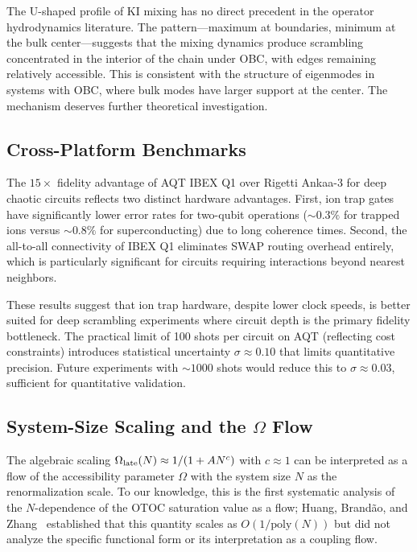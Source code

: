 \documentclass[twocolumn,showpacs,preprintnumbers,amsmath,amssymb,aps,prl]{revtex4-2}
\begin{document}
The U-shaped profile of KI mixing has no direct precedent in the operator
hydrodynamics literature. The pattern---maximum at boundaries, minimum at the
bulk center---suggests that the mixing dynamics produce scrambling concentrated in
the interior of the chain under OBC, with edges remaining relatively accessible.
This is consistent with the structure of eigenmodes in systems with OBC, where
bulk modes have larger support at the center. The mechanism deserves further
theoretical investigation.

\subsection{Cross-Platform Benchmarks}

The $15\times$ fidelity advantage of AQT IBEX Q1 over Rigetti Ankaa-3 for deep
chaotic circuits reflects two distinct hardware advantages. First, ion trap gates
have significantly lower error rates for two-qubit operations (${\sim}0.3\%$ for
trapped ions versus ${\sim}0.8\%$ for superconducting) due to long coherence
times. Second, the all-to-all connectivity of IBEX Q1 eliminates SWAP routing
overhead entirely, which is particularly significant for circuits requiring
interactions beyond nearest neighbors.

These results suggest that ion trap hardware, despite lower clock speeds, is
better suited for deep scrambling experiments where circuit depth is the primary
fidelity bottleneck. The practical limit of 100 shots per circuit on AQT
(reflecting cost constraints) introduces statistical uncertainty
$\sigma \approx 0.10$ that limits quantitative precision. Future experiments with
${\sim}1000$ shots would reduce this to $\sigma \approx 0.03$, sufficient for
quantitative validation.

\subsection{System-Size Scaling and the $\Omega$ Flow}

The algebraic scaling $\Omega_{\rm late}(N) \approx 1/(1+AN^c)$ with $c \approx
1$ can be interpreted as a flow of the accessibility parameter $\Omega$ with the
system size $N$ as the renormalization scale. To our knowledge, this is the first
systematic analysis of the $N$-dependence of the OTOC saturation value as a flow;
Huang, Brand\~ao, and Zhang~\cite{HuangFiniteSize2019} established that this
quantity scales as $O(1/\text{poly}(N))$ but did not analyze the specific
functional form or its interpretation as a coupling flow.
\end{document}
